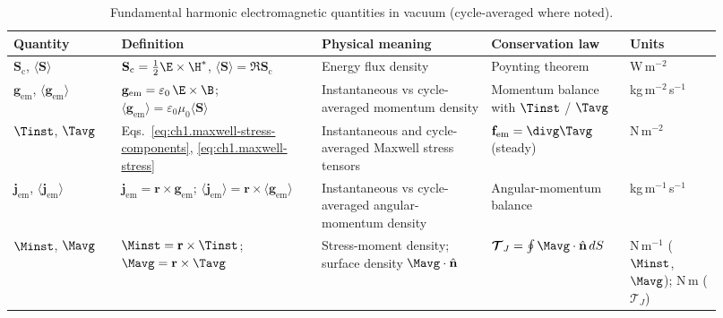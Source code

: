 \begin{table}[t]
\centering
\caption{Fundamental harmonic electromagnetic quantities in vacuum (cycle-averaged where noted).}
\label{tab:ch1.fundamental-quantities}
\small
\begin{tabular}{@{}p{0.14\linewidth}p{0.26\linewidth}p{0.22\linewidth}p{0.18\linewidth}p{0.12\linewidth}@{}}
\toprule
Quantity & Definition & Physical meaning & Conservation law & Units \\
\midrule
$\mathbf{S}_\mathrm{c}$, $\langle\mathbf{S}\rangle$
& $\mathbf{S}_\mathrm{c}=\tfrac12\E\times\H^*$, $\langle\mathbf{S}\rangle=\Re\mathbf{S}_\mathrm{c}$
& Energy flux density & Poynting theorem & W\,m$^{-2}$ \\
$\mathbf{g}_{\mathrm{em}}$, $\langle\mathbf{g}_{\mathrm{em}}\rangle$
& $\mathbf{g}_{\mathrm{em}}=\varepsilon_0\,\E\times\B$; $\langle\mathbf{g}_{\mathrm{em}}\rangle=\varepsilon_0\mu_0\langle\mathbf{S}\rangle$
& Instantaneous vs cycle-averaged momentum density
& Momentum balance with $\Tinst$ / $\Tavg$
& kg\,m$^{-2}$\,s$^{-1}$ \\
$\Tinst$, $\Tavg$
& Eqs.~\eqref{eq:ch1.maxwell-stress-components}, \eqref{eq:ch1.maxwell-stress}
& Instantaneous and cycle-averaged Maxwell stress tensors
& $\mathbf{f}_{\mathrm{em}}=\divg\Tavg$ (steady)
& N\,m$^{-2}$ \\
$\mathbf{j}_{\mathrm{em}}$, $\langle\mathbf{j}_{\mathrm{em}}\rangle$
& $\mathbf{j}_{\mathrm{em}}=\mathbf{r}\times\mathbf{g}_{\mathrm{em}}$; $\langle\mathbf{j}_{\mathrm{em}}\rangle=\mathbf{r}\times\langle\mathbf{g}_{\mathrm{em}}\rangle$
& Instantaneous vs cycle-averaged angular-momentum density
& Angular-momentum balance
& kg\,m$^{-1}$\,s$^{-1}$ \\
$\Minst$, $\Mavg$
& $\Minst=\mathbf{r}\times\Tinst$; $\Mavg=\mathbf{r}\times\Tavg$
& Stress-moment density; surface density $\Mavg\cdot\hat{\mathbf{n}}$
& $\boldsymbol{\mathcal{T}}_J=\oint\Mavg\cdot\hat{\mathbf{n}}\,dS$
& N\,m$^{-1}$ ($\Minst$, $\Mavg$); N\,m ($\boldsymbol{\mathcal{T}}_J$) \\
\bottomrule
\end{tabular}
\end{table}

